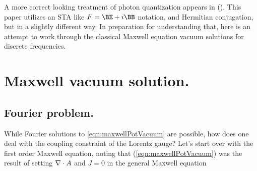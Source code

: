 A more correct looking treatment of photon quantization appears in (\cite{de2004understanding}).  This paper utilizes an STA like $F = \BE + i\BB$ notation, and Hermitian conjugation, but in a slightly different way.  In preparation for understanding that, here is an attempt to work through the classical Maxwell equation vacuum solutions for discrete frequencies.

\section{Maxwell vacuum solution.}

\subsection{Fourier problem.}

While Fourier solutions to \ref{eqn:maxwellPotVacuum} are possible, how does one deal with the coupling constraint of the Lorentz gauge?  Let's start over with the first order Maxwell equation, noting that (\ref{eqn:maxwellPotVacuum}) was the result of setting $\nabla \cdot A$ and $J = 0$ in the general Maxwell equation

\EndArticle
